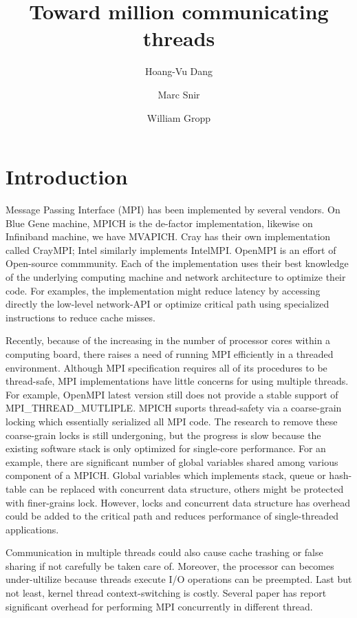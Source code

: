 \documentclass[11pt]{article}
\title{Toward million communicating threads}
\author{Hoang-Vu Dang \and Marc Snir \and William Gropp}
\begin{document}
\maketitle


\section{Introduction}
Message Passing Interface (MPI) has been implemented by several vendors. On
Blue Gene machine, MPICH is the de-factor implementation, likewise on
Infiniband machine, we have MVAPICH. Cray has their own implementation called
CrayMPI; Intel similarly implements IntelMPI. OpenMPI is an effort of
Open-source commmunity. Each of the implementation uses their best knowledge of
the underlying computing machine and network architecture to optimize their
code. For examples, the implementation might reduce latency by accessing
directly the low-level network-API or optimize critical path using specialized
instructions to reduce cache misses.

Recently, because of the increasing in the number of processor cores within a
computing board, there raises a need of running MPI efficiently in a threaded
environment.  Although MPI specification requires all of its procedures to be
thread-safe, MPI implementations have little concerns for using multiple
threads. For example, OpenMPI latest version still does not provide a stable
support of MPI\_THREAD\_MUTLIPLE.  MPICH suports thread-safety via a
coarse-grain locking which essentially serialized all MPI code. The research to
remove these coarse-grain locks is still undergoning, but the progress is slow
because the existing software stack is only optimized for single-core
performance. For an example, there are significant number of global variables
shared among various component of a MPICH. Global variables which implements
stack, queue or hash-table can be replaced with concurrent data structure,
others might be protected with finer-grains lock. 
However, locks and concurrent data structure has overhead could be added to  
the critical path and reduces performance of single-threaded applications.

Communication in multiple threads could also cause cache trashing or false
sharing if not carefully be taken care of. Moreover, the processor can becomes
under-ultilize because threads execute I/O operations can be preempted. Last but
not least, kernel thread context-switching is costly. Several paper has report
significant overhead for performing MPI concurrently in different thread.
\end{document}
